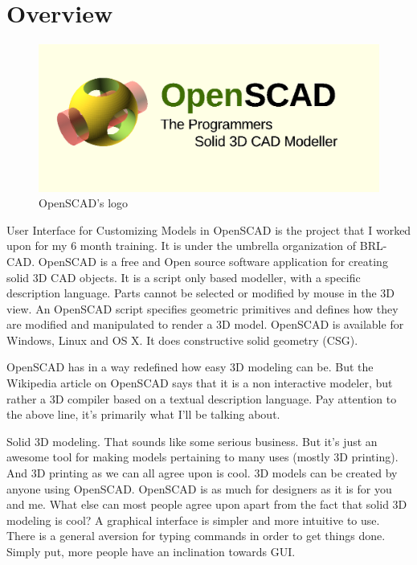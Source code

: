 \section{Overview}

\begin{figure}[H] 
	\centering \includegraphics[scale=0.31]{images/openscad.png}
	\caption{OpenSCAD's logo}
	\label{fig:openscadlogo}
\end{figure}

User Interface for Customizing Models in OpenSCAD is the project that I worked upon for my 6 month training. It is under the umbrella organization of BRL-CAD. OpenSCAD is a free and Open source software application for creating solid 3D CAD objects. It is a script only based modeller, with a specific description language. Parts cannot be selected or modified by mouse in the 3D view. An OpenSCAD script specifies geometric primitives and defines how they are modified and manipulated to render a 3D model. OpenSCAD is available for Windows, Linux and OS X. It does constructive solid geometry (CSG).

OpenSCAD has in a way redefined how easy 3D modeling can be. But the Wikipedia article on OpenSCAD says that it is a non interactive modeler, but rather a 3D compiler based on a textual description language. Pay attention to the above line, it’s primarily what I’ll be talking about.

Solid 3D modeling. That sounds like some serious business. But it’s just an awesome tool for making models pertaining to many uses (mostly 3D printing). And 3D printing as we can all agree upon is cool. 3D models can be created by anyone using OpenSCAD. OpenSCAD is as much for designers as it is for you and me. What else can most people agree upon apart from the fact that solid 3D modeling is cool? A graphical interface is simpler and more intuitive to use. There is a general aversion for typing commands in order to get things done. Simply put, more people have an inclination towards GUI.

